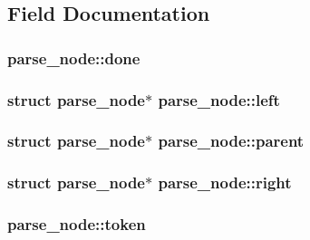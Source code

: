 \subsection{Field Documentation}
\subsubsection[{\texorpdfstring{done}{done}}]{ parse\+\_\+node\+::done}\hypertarget{structparse__node_ac5e740e51f5c8c2bda60c932d1892359}{}\label{structparse__node_ac5e740e51f5c8c2bda60c932d1892359}
\subsubsection[{\texorpdfstring{left}{left}}]{\setlength{\rightskip}{0pt plus 5cm}struct {\bf parse\+\_\+node}$\ast$ parse\+\_\+node\+::left}\hypertarget{structparse__node_ab9a24e48447a6cbbe34cdb8ff364578b}{}\label{structparse__node_ab9a24e48447a6cbbe34cdb8ff364578b}
\subsubsection[{\texorpdfstring{parent}{parent}}]{\setlength{\rightskip}{0pt plus 5cm}struct {\bf parse\+\_\+node}$\ast$ parse\+\_\+node\+::parent}\hypertarget{structparse__node_abf50c2b0dbe9fb65b7707b02724358c2}{}\label{structparse__node_abf50c2b0dbe9fb65b7707b02724358c2}
\subsubsection[{\texorpdfstring{right}{right}}]{\setlength{\rightskip}{0pt plus 5cm}struct {\bf parse\+\_\+node}$\ast$ parse\+\_\+node\+::right}\hypertarget{structparse__node_afeafa07d7177ac8d4c395f9a8a9575bf}{}\label{structparse__node_afeafa07d7177ac8d4c395f9a8a9575bf}
\subsubsection[{\texorpdfstring{token}{token}}]{ parse\+\_\+node\+::token}\hypertarget{structparse__node_a86e3215f763b4feb8b56f17cdb5301c5}{}\label{structparse__node_a86e3215f763b4feb8b56f17cdb5301c5}
